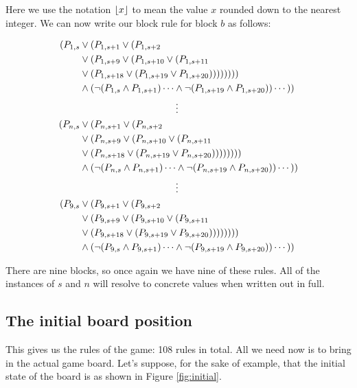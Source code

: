 \documentclass[10pt]{article}
\begin{document}
Here we use the notation $\left\lfloor x \right\rfloor$ to mean the value $x$ rounded down to the nearest integer. We can now write our block rule for block $b$ as follows:

\begin{align*}
(P_{1, s} & \lor (P_{1, s + 1} \lor (P_{1, s + 2} \\
& \lor (P_{1, s + 9} \lor (P_{1, s + 10} \lor (P_{1, s + 11} \\
& \lor (P_{1, s + 18} \lor (P_{1, s + 19} \lor P_{1, s + 20})))))))) \\
& \land (\lnot(P_{1, s} \land P_{1, s + 1}) \cdots \land \lnot(P_{1, s + 19} \land P_{1, s + 20})) \cdots )) \\
& \qquad \qquad \qquad \qquad \qquad \vdots \\
(P_{n, s} & \lor (P_{n, s + 1} \lor (P_{n, s + 2} \\
& \lor (P_{n, s + 9} \lor (P_{n, s + 10} \lor (P_{n, s + 11} \\
& \lor (P_{n, s + 18} \lor (P_{n, s + 19} \lor P_{n, s + 20})))))))) \\
& \land (\lnot(P_{n, s} \land P_{n, s + 1}) \cdots \land \lnot(P_{n, s + 19} \land P_{n, s + 20})) \cdots )) \\
& \qquad \qquad \qquad \qquad \qquad \vdots \\
(P_{9, s} & \lor (P_{9, s + 1} \lor (P_{9, s + 2} \\
& \lor (P_{9, s + 9} \lor (P_{9, s + 10} \lor (P_{9, s + 11} \\
& \lor (P_{9, s + 18} \lor (P_{9, s + 19} \lor P_{9, s + 20})))))))) \\
& \land (\lnot(P_{9, s} \land P_{9, s + 1}) \cdots \land \lnot(P_{9, s + 19} \land P_{9, s + 20})) \cdots )) \\
\end{align*}

There are nine blocks, so once again we have nine of these rules. All of the instances of $s$ and $n$ will resolve to concrete values when written out in full.

\subsection{The initial board position}

This gives us the rules of the game: 108 rules in total. All we need now is to bring in the actual game board. Let's suppose, for the sake of example, that the initial state of the board is as shown in Figure \ref{fig:initial}.
\end{document}
